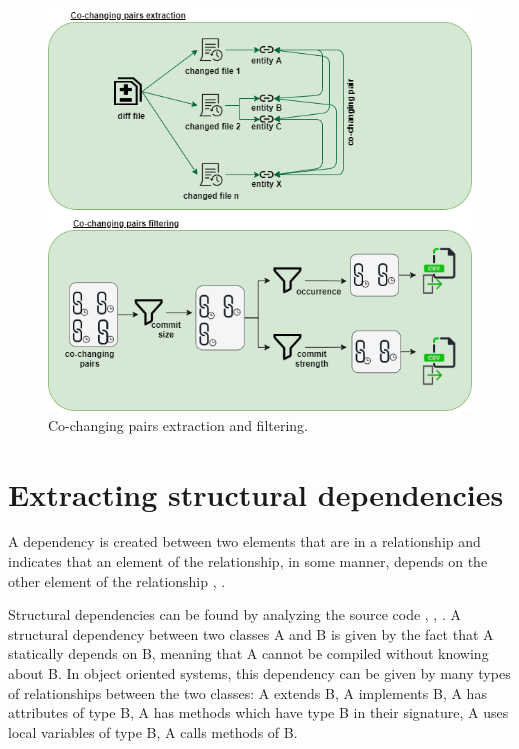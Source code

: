 \documentclass[12pt]{mitthesis}
\begin{document}
\begin{figure}[H]
\centering
\includegraphics[width=\textwidth]{pairs_filtering.png}
\caption{Co-changing pairs extraction and filtering.}
\label{fig:figfiltering}
\end{figure}


\section{Extracting structural dependencies}
\label{sec:sd_extraction}
A dependency is created between two elements that are in a relationship and indicates that an element of the relationship, in some manner, depends on the other element of the relationship \cite{Booch:2004:OAD:975416}, \cite{Cataldo2009SoftwareDW}.

Structural dependencies can be found by analyzing the source code \cite{Sangal:2005:UDM:1094811.1094824}, \cite{CalloArias2011}, \cite{structdep}. A structural dependency between two classes A and B is given by the fact that A statically depends on B, meaning that A cannot be compiled without knowing about B. In object oriented systems, this dependency can be given by many types of relationships between the two classes: A extends B, A implements B, A has attributes of type B, A has methods which have type B in their signature, A uses local variables of type B, A calls methods of B.
\end{document}

